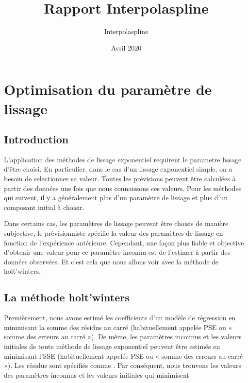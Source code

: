 \documentclass[a4paper,12pt]{article} %
\title{Rapport Interpolaspline}
\author{Interpolaspline}
\date{Avril 2020}
\begin{document}
 \maketitle

\section{Optimisation du paramètre de lissage}

\subsection{Introduction}

L'application des méthodes de lissage exponentiel requirent le parametre lissage d'être choisi. En particulier, dans le cas d'un lissage exponentiel simple, on  a besoin de selectionner sa valeur.
Toutes les prévisions peuvent être calculées à partir des données une fois que nous connaissons ces valeurs. Pour les méthodes qui suivent, il y a généralement plus d’un paramètre de lissage et plus d’un composant initial à choisir.

Dans certains cas, les paramètres de lissage peuvent être choisis de manière subjective, le prévisionniste spécifie la valeur des paramètres de lissage en fonction de l’expérience antérieure. Cependant, une façon plus fiable et objective d’obtenir une valeur pour ce paramètre inconnu est de l'estimer à partir des données observées. Et c'est cela que nous allons voir avec la méthode de holt'winters.

\subsection{La méthode holt'winters}


Premièrement,  nous avons estimé les coefficients d’un modèle de régression en minimisant la somme des résidus au carré (habituellement appelée PSE ou « somme des erreurs au carré »). De même, les paramètres inconnus et les valeurs initiales de toute méthode de lissage exponentiel peuvent être estimés en minimisant l’SSE (habituellement appelée PSE ou « somme des erreurs au carré »). Les résidus sont spécifiés comme . Par conséquent, nous trouvons les valeurs des paramètres inconnus et les valeurs initiales qui minimisent
     
\end{document}
